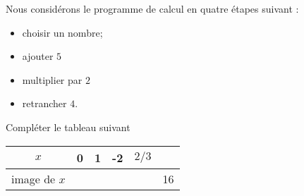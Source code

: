 
\begin{exercice}\label{exoSeconde-0042}

    Nous considérons le programme de calcul en quatre étapes suivant :
    \begin{itemize}
        \item
            choisir un nombre;
        \item
            ajouter \( 5\)
        \item
            multiplier par \( 2\)
        \item
            retrancher \( 4\).
    \end{itemize}
    Compléter le tableau suivant
    \begin{center}
        \begin{tabular}[h]{|c||c|c|c|c|c|}
            \hline
            \( x\)&0&1&-2&$2/3$&\\
            \hline
            image de \( x\)& & & & & 16\\
            \hline
        \end{tabular}
    \end{center}

\end{exercice}

